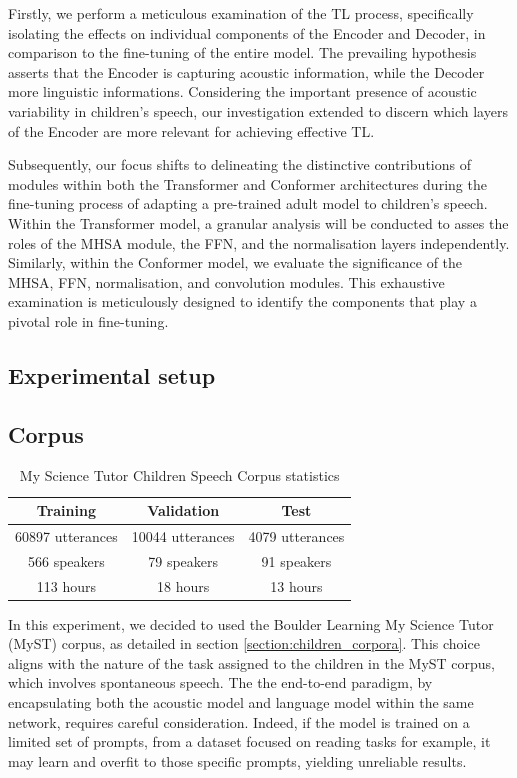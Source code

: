 Firstly, we perform a meticulous examination of the TL process, specifically isolating the effects on individual components of the Encoder and Decoder, in comparison to the fine-tuning of the entire model. The prevailing hypothesis asserts that the Encoder is  capturing acoustic information, while the Decoder more linguistic informations. Considering the important presence of acoustic variability in children's speech, our investigation extended to discern which layers of the Encoder are more relevant for achieving effective TL.

Subsequently, our focus shifts to delineating the distinctive contributions of modules within both the Transformer and Conformer architectures during the fine-tuning process of adapting a pre-trained adult model to children's speech. Within the Transformer model, a granular analysis will be conducted to asses the roles of the MHSA module, the FFN, and the normalisation layers independently. Similarly, within the Conformer model, we evaluate the significance of the MHSA, FFN, normalisation, and convolution modules. This exhaustive examination is meticulously designed to identify the components that play a pivotal role in fine-tuning.


\subsection{Experimental setup}
\label{section:methods_chapter4}

\subsection{Corpus}
\begin{table}[ht]
\centering
\begin{tabular}{c|c|c}
\hline
 Training & Validation     & Test   \\ \hline
60897 utterances  & 10044 utterances   & 4079 utterances \\ 
 566 speakers  & 79 speakers   & 91 speakers \\ 
 113 hours  & 18 hours   & 13 hours \\ \hline

\end{tabular}
\caption{My Science Tutor Children Speech Corpus statistics}
\label{tab:statistics_myst}
\end{table}
In this experiment, we decided to used  the Boulder Learning My Science Tutor (MyST) corpus, as detailed in section \ref{section:children_corpora}. This choice aligns with the nature of the task assigned to the children in the MyST corpus, which involves spontaneous speech. The the end-to-end paradigm, by encapsulating both the acoustic model and language model within the same network, requires careful consideration. Indeed, if the model is trained on a limited set of prompts, from a dataset focused on reading tasks for example, it may learn and overfit to those specific prompts, yielding unreliable results.

